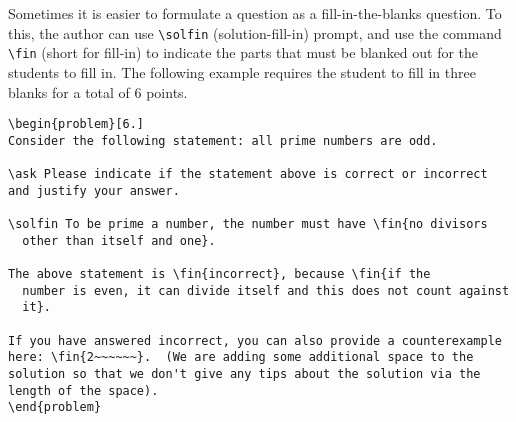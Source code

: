 \begin{cluster}
\label{grp:xmpl:quiz::fill-in-the-blanks-questions}

\begin{example}
\label{xmpl:quiz::fill-in-the-blanks-questions}
Sometimes it is easier to formulate a question as a fill-in-the-blanks
question.  To this, the author can use \lstinline`\solfin`
(solution-fill-in) prompt, and
use the command \lstinline`\fin` (short for fill-in) to indicate the
parts that must be blanked  out for  the students to fill in.
The following example requires the student
to fill in three blanks for a total of $6$ points.

\begin{lstlisting}
\begin{problem}[6.]
Consider the following statement: all prime numbers are odd.

\ask Please indicate if the statement above is correct or incorrect
and justify your answer.

\solfin To be prime a number, the number must have \fin{no divisors
  other than itself and one}.

The above statement is \fin{incorrect}, because \fin{if the
  number is even, it can divide itself and this does not count against
  it}.

If you have answered incorrect, you can also provide a counterexample
here: \fin{2~~~~~~}.  (We are adding some additional space to the
solution so that we don't give any tips about the solution via the
length of the space).
\end{problem}
\end{lstlisting}

\end{example}
\end{cluster}


